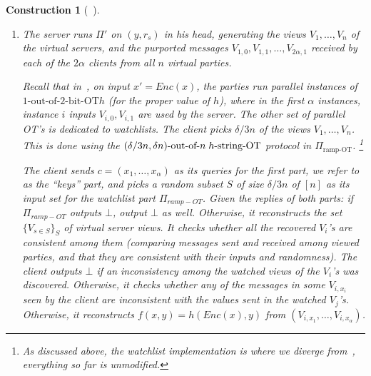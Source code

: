 \documentclass[a4paper]{article}
\newtheorem{construction}{Construction}
\newcommand{\OT}[2]{#1\text{-out-of-}#2\text{-bit-OT}}
\newcommand{\sOT}[3]{#1\text{-out-of-}#2\text{\;$#3$-string-OT}}
\begin{document}
\begin{construction}[~\cite{IKOPS11}]
\begin{enumerate}
	The protocol has the following security guarantees.
	It is perfectly correct against any adversary corrupting
	the sender and at most $\delta n$ of the servers, and any number of the clients. Such protocols exist for all $\delta<1/3$.
	Also, we will $n$ to satisfy $2\lfloor \delta/3 n\rfloor < \lfloor \delta n\rfloor$ (from now on we omit $\lfloor\;\rfloor$ for brevity). Let us fix $\delta = 1/4$, which imposes that $n > 12$.
	
	If the sender is honest, $\Pi_{HM}$ is perfectly private against \emph{semi-honest} adversaries corrupting any subset of clients, and up to $\delta n$ of the virtual servers. 
	Consider~\cite{BGW88} as such a protocol with CC linear in the size of the encoding circuit, which is an optimized variant of~\cite{BGW88}.
	\item The server runs $\Pi'$ on $(y,r_s)$ in his head, generating the views $V_1,\ldots,V_n$ of the virtual servers, and the purported messages $V_{1,0},V_{1,1},\ldots,V_{2\alpha,1}$ received by each of the $2\alpha$ clients from all $n$ virtual parties.
	
	Recall that in~\cite{IKOPS11}, on input $x'=Enc(x)$, the parties run
	parallel instances of $\OT{1}{2}{h}$ (for the proper value of $h$), where in the first $\alpha$ instances, instance $i$ inputs $V_{i,0},V_{i,1}$ are used by the server. 
	The other set of parallel OT's is dedicated to watchlists.
	The client picks $\delta/3 n$  of the views $V_1,\ldots,V_n$.
	This is done using the $\sOT{(\delta/3n ,\delta n)}{n}{h}$ protocol in $\Pi_{\text{ramp-OT}}$. 
	\footnote{As discussed above, the watchlist implementation is where we diverge from~\cite{IKOPS11}, everything so far is unmodified.}
	
	The client sends $c=(x_1,\ldots,x_\alpha)$ as its queries for the first part, we refer to as the ``keys'' part, and picks a random subset $S$ of size $\delta/3 n$ of $[n]$ as its input set for the watchlist part $\Pi_{ramp-OT}$.
	Given the replies of both parts: if $\Pi_{ramp-OT}$ outputs $\bot$, output $\bot$ as well. Otherwise, it reconstructs the set $\{V_{s\in S}\}_S$ of virtual server views.
	It checks whether all the recovered $V_i$'s are consistent among them (comparing messages sent and received among viewed parties, and that they are consistent with their inputs and randomness).
	The client outputs $\bot$ if an inconsistency among the watched views of the $V_i$'s was discovered. Otherwise, it checks whether any of the messages in some $V_{i,x_i}$ seen by the client are inconsistent with the values sent in the watched $V_j$'s. Otherwise, it reconstructs $f(x,y)=h(Enc(x),y)$ from $(V_{i,x_1},\ldots,V_{i,x_\alpha})$. 
	
	\end{enumerate}
\end{construction}	
\end{document}
